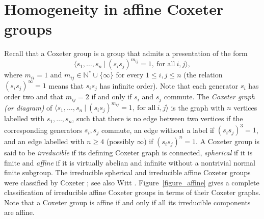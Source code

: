 \documentclass[a4paper, 11pt]{amsart}
\theoremstyle{definition}
\theoremstyle{remark}
\renewcommand{\leq}{\leqslant}
\renewcommand{\geq}{\geqslant}
\begin{document}
\section{Homogeneity in affine Coxeter groups}\label{homogeneity_Coxeter}

Recall that a Coxeter group is a group that admits a presentation of the form \[\langle s_1,\ldots,s_n \ \vert \ (s_is_j)^{m_{ij}}=1, \ \text{for all} \ i,j \rangle,\]where $m_{ii}=1$ and $m_{ij}\in \mathbb{N}^{\ast}\cup \lbrace \infty\rbrace$ for every $1\leq i,j\leq n$ (the relation $(s_is_j)^{\infty}=1$ means that $s_is_j$ has infinite order). Note that each generator $s_i$ has order two and that $m_{ij}=2$ if and only if $s_i$ and $s_j$ commute. The \emph{Coxeter graph (or diagram)} of $\langle s_1,\ldots,s_n \ \vert \ (s_is_j)^{m_{ij}}=1, \ \text{for all} \ i,j \rangle$ is the graph with $n$ vertices labelled with $s_1,\ldots,s_n$, such that there is no edge between two vertices if the corresponding generators $s_i,s_j$ commute, an edge without a label if $(s_is_j)^3=1$, and an edge labelled with $n\geq 4$ (possibly $\infty$) if $(s_is_j)^n=1$. A Coxeter group is said to be \emph{irreducible} if its defining Coxeter graph is connected, \emph{spherical} if it is finite and \emph{affine} if it is virtually abelian and infinite without a nontrivial normal finite subgroup. The irreducible spherical and irreducible affine Coxeter groups were classified by Coxeter \cite{Cox32,Cox34}; see also Witt \cite{Witt41}. Figure~\ref{figure_affine} gives a complete classification of irreducible affine Coxeter groups in terms of their Coxeter graphs. Note that a Coxeter group is affine if and only if all its irreducible components are affine. 




\end{document}
